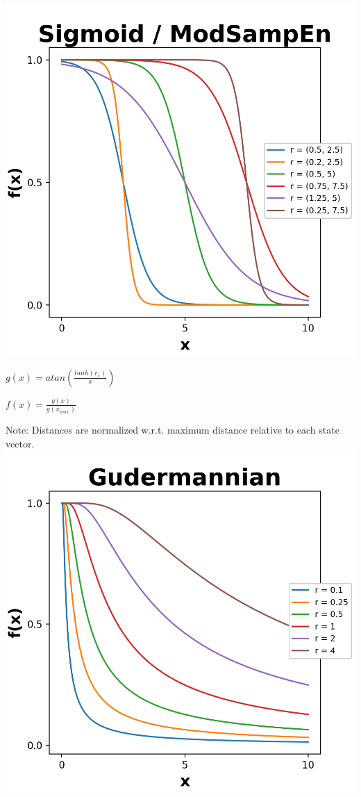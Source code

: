\documentclass[12pt, a4paper, titlepage, openany]{book}
\begin{document}
\begin{description}[labelsep=1cm, labelwidth=2cm, nosep,,style=multiline,leftmargin=3cm]
\begin{description}[labelsep=14em, labelwidth=10em, nosep,style=multiline,leftmargin=6cm]
		\includegraphics[scale=.5]{Fuzz1.png}
	\item[\texttt{"gudermannian"}] 	$g(x) = atan(\frac{tanh(r_1)}{x})$
	\item[]	$f(x) = \frac{g(x)}{g(x_{max})}$
	\item[]		Note: Distances are normalized w.r.t. maximum distance relative to each state vector.\\
		\includegraphics[scale=.5]{Fuzz3.png}

\end{description}
\end{description}
\end{document}
